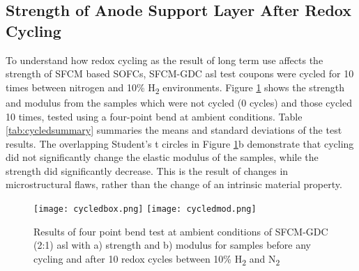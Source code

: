     \subsection{Strength of Anode Support Layer After Redox Cycling}
        To understand how redox cycling as the result of long term use affects the strength of SFCM based SOFCs, SFCM-GDC \gls{asl} test coupons were cycled for 10 times between nitrogen and 10\% H\textsubscript{2} environments.
        Figure \ref{fig:cycledbox} shows the strength and modulus from the samples which were not cycled (0 cycles) and those cycled 10 times, tested using a four-point bend at ambient conditions.
        Table \ref{tab:cycledsummary} summaries the means and standard deviations of the test results.
        The overlapping Student's t circles in Figure \ref{fig:cycledbox}b demonstrate that cycling did not significantly change the elastic modulus of the samples, while the strength did significantly decrease.
        This is the result of changes in microstructural flaws, rather than the change of an intrinsic material property.

        \begin{figure}
          \texttt{[image: cycledbox.png]}
          \texttt{[image: cycledmod.png]}
          \caption{Results of four point bend test at ambient conditions of SFCM-GDC (2:1) \gls{asl} with a) strength and b) modulus for samples before any cycling and after 10 redox cycles between 10\% H\textsubscript{2} and N\textsubscript{2}}
          \label{fig:cycledbox}
        \end{figure}

